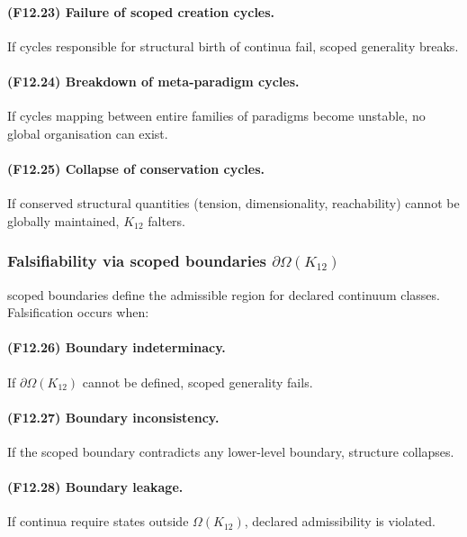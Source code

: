 \paragraph{(F12.23) Failure of scoped creation cycles.}
If cycles responsible for structural birth of continua fail,
scoped generality breaks.

\paragraph{(F12.24) Breakdown of meta-paradigm cycles.}
If cycles mapping between entire families of paradigms become unstable,
no global organisation can exist.

\paragraph{(F12.25) Collapse of conservation cycles.}
If conserved structural quantities (tension, dimensionality, reachability)
cannot be globally maintained, $K_{12}$ falters.



\subsubsection{Falsifiability via scoped boundaries $\partial\Omega(K_{12})$}

scoped boundaries define the admissible region for declared continuum classes.
Falsification occurs when:

\paragraph{(F12.26) Boundary indeterminacy.}
If $\partial\Omega(K_{12})$ cannot be defined, scoped generality fails.

\paragraph{(F12.27) Boundary inconsistency.}
If the scoped boundary contradicts any lower-level boundary,
structure collapses.

\paragraph{(F12.28) Boundary leakage.}
If continua require states outside $\Omega(K_{12})$,  
declared admissibility is violated.

